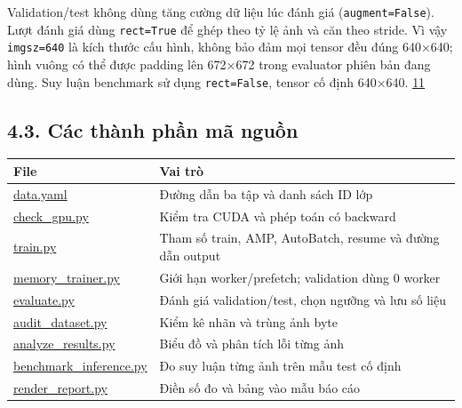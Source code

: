 \documentclass[
  vietnamese,
  12pt,
  a4paper,
]{article}
\newcounter{none} %
\begin{document}
Validation/test không dùng tăng cường dữ liệu lúc đánh giá
(\texttt{a\allowbreak{}u\allowbreak{}g\allowbreak{}m\allowbreak{}e\allowbreak{}n\allowbreak{}t\allowbreak{}=\allowbreak{}F\allowbreak{}a\allowbreak{}l\allowbreak{}s\allowbreak{}e\allowbreak{}}).
Lượt đánh giá dùng
\texttt{r\allowbreak{}e\allowbreak{}c\allowbreak{}t\allowbreak{}=\allowbreak{}T\allowbreak{}r\allowbreak{}u\allowbreak{}e\allowbreak{}}
để ghép theo tỷ lệ ảnh và căn theo stride. Vì vậy
\texttt{i\allowbreak{}m\allowbreak{}g\allowbreak{}s\allowbreak{}z\allowbreak{}=\allowbreak{}6\allowbreak{}4\allowbreak{}0\allowbreak{}}
là kích thước cấu hình, không bảo đảm mọi tensor đều đúng 640×640; hình
vuông có thể được padding lên 672×672 trong evaluator phiên bản đang
dùng. Suy luận benchmark sử dụng
\texttt{r\allowbreak{}e\allowbreak{}c\allowbreak{}t\allowbreak{}=\allowbreak{}F\allowbreak{}a\allowbreak{}l\allowbreak{}s\allowbreak{}e\allowbreak{}},
tensor cố định 640×640.
\href{https://docs.ultralytics.com/modes/val/}{11}

\subsection{4.3. Các thành phần mã
nguồn}\label{cuxe1c-thuxe0nh-phux1ea7n-muxe3-nguux1ed3n}

\begingroup\small\setlength{\tabcolsep}{4pt}\renewcommand{\arraystretch}{1.12}

{\def\LTcaptype{none} %
\begin{longtable}[]{@{}
  >{\raggedright\arraybackslash}p{}
  >{\raggedright\arraybackslash}p{}@{}}
\toprule\noalign{}
\begin{minipage}[b]{\linewidth}\raggedright
File
\end{minipage} & \begin{minipage}[b]{\linewidth}\raggedright
Vai trò
\end{minipage} \\
\midrule\noalign{}
\endhead
\bottomrule\noalign{}
\endlastfoot
\url{data.yaml} & Đường dẫn ba tập và danh sách ID lớp \\
\url{check_gpu.py} & Kiểm tra CUDA và phép toán có backward \\
\url{train.py} & Tham số train, AMP, AutoBatch, resume và đường dẫn
output \\
\url{memory_trainer.py} & Giới hạn worker/prefetch; validation dùng 0
worker \\
\url{evaluate.py} & Đánh giá validation/test, chọn ngưỡng và lưu số
liệu \\
\url{audit_dataset.py} & Kiểm kê nhãn và trùng ảnh byte \\
\url{analyze_results.py} & Biểu đồ và phân tích lỗi từng ảnh \\
\url{benchmark_inference.py} & Đo suy luận từng ảnh trên mẫu test cố
định \\
\url{render_report.py} & Điền số đo và bảng vào mẫu báo cáo \\
\end{longtable}
}
\end{document}
